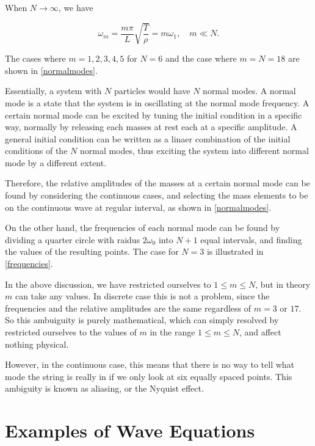 \documentclass[a4paper,12pt]{report}
\begin{document}
When \(N \to \infty\), we have 

\begin{equation}
	\omega _{m} =  \frac{m\pi }{L} \sqrt{\frac{T}{\rho } } = m \omega _{1} , \quad m \ll N.
\end{equation}

The cases where \(m = 1,2,3,4,5\) for \(N = 6\) and the case where \(m = N = 18\) are shown in \cref{normalmodes}. 


Essentially, a system with \(N\) particles would have \(N\) normal modes. A normal mode is a state that the system is in oscillating at the normal mode frequency. A certain normal mode can be excited by tuning the initial condition in a specific way, normally by releasing each masses at rest each at a specific amplitude. A general initial condition can be written as a linaer combination of the initial conditions of the \(N\) normal modes, thus exciting the system into different normal mode by a different extent. 

Therefore, the relative amplitudes of the masses at a certain normal mode can be found by considering the continuous cases, and selecting the mass elements to be on the continuous wave at regular interval, as shown in \cref{normalmodes}. 

On the other hand, the frequencies of each normal mode can be found by dividing a quarter circle with raidus \(2 \omega _{0} \) into \(N+1\) equal intervals, and finding the values of the resulting points. The case for \(N=3\) is illustrated in \cref{frequencies}.


In the above discussion, we have restricted ourselves to \(1 \le m \le N\), but in theory \(m\) can take any values. In discrete case this is not a problem, since the frequencies and the relative amplitudes are the same regardless of \(m = 3 \text { or } 17\). So this ambuiguity is purely mathematical, which can simply resolved by restricted ourselves to the values of \(m\) in the range \(1 \le m \le N\), and affect nothing physical. 

However, in the continuous case, this means that there is no way to tell what mode the string is really in if we only look at six equally spaced points. This ambiguity is known as aliasing, or the Nyquist effect.

\section{Examples of Wave Equations}
\end{document}
